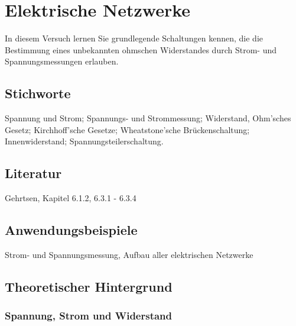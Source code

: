 \chapter{Elektrische Netzwerke}
\label{v:13}

In diesem Versuch lernen Sie grundlegende Schaltungen kennen, die die Bestimmung eines unbekannten ohmschen Widerstandes durch Strom- und Spannungsmessungen erlauben. 

\section{Stichworte}

Spannung und Strom; Spannungs- und Strommessung; Widerstand, Ohm'sches Gesetz; Kirchhoff'sche Gesetze; Wheatstone'sche Brückenschaltung; Innenwiderstand; Spannungsteilerschaltung.
%
\section{Literatur}

Gehrtsen, Kapitel 6.1.2, 6.3.1 - 6.3.4
%
\section{Anwendungsbeispiele}

Strom- und Spannungsmessung, Aufbau aller elektrischen Netzwerke

\section{Theoretischer Hintergrund}

\subsection{Spannung, Strom und Widerstand}

